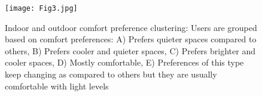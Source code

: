   


\begin{figure}
\begin{center}
\texttt{[image: Fig3.jpg]}
\caption{Indoor and outdoor comfort preference clustering: Users are grouped based on comfort preferences: A) Prefers quieter spaces compared to others, B) Prefers cooler and quieter spaces, C) Prefers brighter and cooler spaces, D) Mostly comfortable, E) Preferences of this type keep changing as compared to others but they are usually comfortable with light levels}
\label{fig:clustering}
\end{center}
\end{figure}

